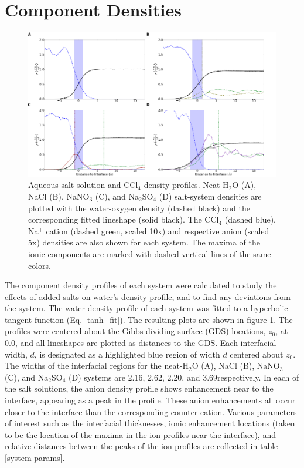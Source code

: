 \section{Component Densities}

\begin{figure}[h!]
\begin{center}
	\includegraphics[scale=1.0]{images/densities.png}
	\caption{Aqueous salt solution and CCl$_4$ density profiles. Neat-H$_2$O (A), NaCl (B), NaNO$_3$ (C), and Na$_2$SO$_4$ (D) salt-system densities are plotted with the water-oxygen density (dashed black) and the corresponding fitted lineshape (solid black). The CCl$_4$ (dashed blue), Na$^+$ cation (dashed green, scaled 10x) and respective anion (scaled 5x) densities are also shown for each system. The maxima of the ionic components are marked with dashed vertical lines of the same colors.}
	\label{fig:density-plots}
\end{center}
\end{figure}

The component density profiles of each system were calculated to study the effects of added salts on water's density profile, and to find any deviations from the \ctcwat system. The water density profile of each system was fitted to a hyperbolic tangent function (Eq. \ref{tanh_fit}). The resulting plots are shown in figure \ref{fig:density-plots}. The profiles were centered about the Gibbs dividing surface (GDS) locations, $z_0$, at 0.0\angs, and all lineshapes are plotted as distances to the GDS. Each interfacial width, $d$, is designated as a highlighted blue region of width $d$ centered about $z_0$.  The widths of the interfacial regions for the neat-H$_2$O (A), NaCl (B), NaNO$_3$ (C), and Na$_2$SO$_4$ (D) systems are 2.16, 2.62, 2.20, and 3.69\angs respectively. In each of the salt solutions, the anion density profile shows enhancement near to the interface, appearing as a peak in the profile. These anion enhancements all occur closer to the interface than the corresponding counter-cation. Various parameters of interest such as the interfacial thicknesses, ionic enhancement locations (taken to be the location of the maxima in the ion profiles near the interface), and relative distances between the peaks of the ion profiles are collected in table \ref{system-params}.


